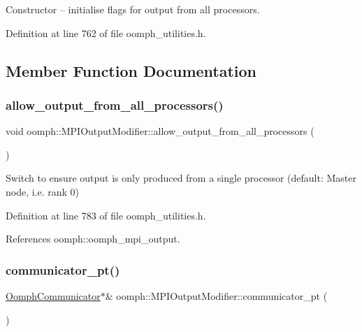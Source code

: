 Constructor -- initialise flags for output from all processors. 



Definition at line 762 of file oomph\+\_\+utilities.\+h.



\subsection{Member Function Documentation}
\mbox{\label{classoomph_1_1MPIOutputModifier_af4b8be91b5f6eb8be549f2926047aa14}} 
\subsubsection{\texorpdfstring{allow\+\_\+output\+\_\+from\+\_\+all\+\_\+processors()}{allow\_output\_from\_all\_processors()}}
{\footnotesize\ttfamily void oomph\+::\+M\+P\+I\+Output\+Modifier\+::allow\+\_\+output\+\_\+from\+\_\+all\+\_\+processors (\begin{DoxyParamCaption}{ }\end{DoxyParamCaption})\hspace{0.3cm}{\ttfamily [inline]}}

Switch to ensure output is only produced from a single processor (default\+: Master node, i.\+e. rank 0) 

Definition at line 783 of file oomph\+\_\+utilities.\+h.



References oomph\+::oomph\+\_\+mpi\+\_\+output.

\mbox{\label{classoomph_1_1MPIOutputModifier_a202e3f2782ae00192349a3969c3c38d2}} 
\subsubsection{\texorpdfstring{communicator\+\_\+pt()}{communicator\_pt()}}
{\footnotesize\ttfamily \hyperlink{classoomph_1_1OomphCommunicator}{Oomph\+Communicator}$\ast$\& oomph\+::\+M\+P\+I\+Output\+Modifier\+::communicator\+\_\+pt (\begin{DoxyParamCaption}{ }\end{DoxyParamCaption})\hspace{0.3cm}{\ttfamily [inline]}}



